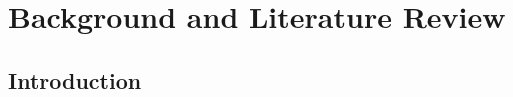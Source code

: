 \chapter{Background and Literature Review}

\begin{intro_block}
\lipsum[1]
\end{intro_block}

\section{Introduction}\label{c2sec:intro}

